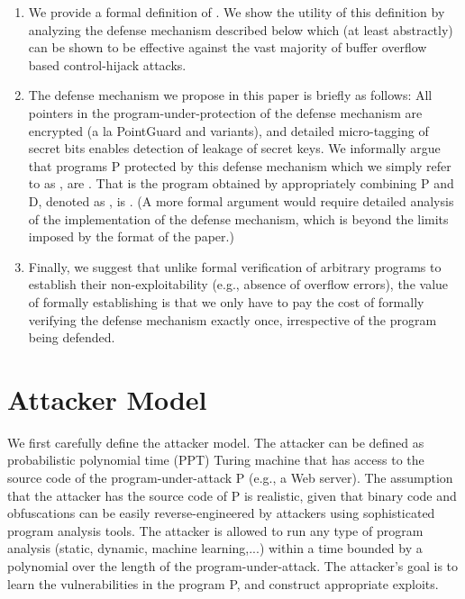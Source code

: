 \begin{enumerate}

\item We provide a formal definition of \resistance. We show the
  utility of this definition by analyzing the defense mechanism
  described below which (at least abstractly) can be shown to be
  effective against the vast majority of buffer overflow based
  control-hijack attacks.

\item The defense mechanism we propose in this paper is briefly as
  follows: All pointers in the program-under-protection of the defense
  mechanism are encrypted (a la PointGuard and variants), and detailed
  micro-tagging of secret bits enables detection of leakage of secret
  keys. We informally argue that programs P protected by this defense
  mechanism which we simply refer to as , are \resistant. That is
  the program obtained by appropriately combining P and D, denoted as
  , is \resistant. (A more formal argument would require detailed
  analysis of the implementation of the defense mechanism, which is
  beyond the limits imposed by the format of the paper.)

\item Finally, we suggest that unlike formal verification of arbitrary
  programs to establish their non-exploitability (e.g., absence of
  overflow errors), the value of formally establishing \resistance is
  that we only have to pay the cost of formally verifying the defense
  mechanism exactly once, irrespective of the program being defended.

\end{enumerate}

\section{Attacker Model}

We first carefully define the attacker model. The attacker can be
defined as probabilistic polynomial time (PPT) Turing machine that has
access to the source code of the program-under-attack P (e.g., a Web
server). The assumption that the attacker has the source code of P is
realistic, given that binary code and obfuscations can be easily
reverse-engineered by attackers using sophisticated program analysis
tools. The attacker is allowed to run any type of program analysis
(static, dynamic, machine learning,...)  within a time bounded by a
polynomial over the length of the program-under-attack. The attacker's
goal is to learn the vulnerabilities in the program P, and construct
appropriate exploits.

